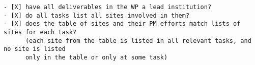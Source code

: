 \begin{draft}
\begin{verbatim}
- [X] have all deliverables in the WP a lead institution?
- [X] do all tasks list all sites involved in them? 
- [X] does the table of sites and their PM efforts match lists of sites for each task?
      (each site from the table is listed in all relevant tasks, and no site is listed
      only in the table or only at some task)
\end{verbatim}
\end{draft}



